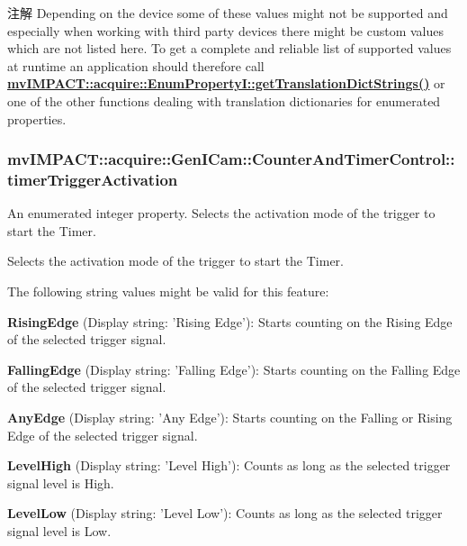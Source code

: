 \begin{DoxyNote}{注解}
Depending on the device some of these values might not be supported and especially when working with third party devices there might be custom values which are not listed here. To get a complete and reliable list of supported values at runtime an application should therefore call {\bfseries \hyperlink{classmv_i_m_p_a_c_t_1_1acquire_1_1_enum_property_i_a0ba6ccbf5ee69784d5d0b537924d26b6}{mv\+I\+M\+P\+A\+C\+T\+::acquire\+::\+Enum\+Property\+I\+::get\+Translation\+Dict\+Strings()}} or one of the other functions dealing with translation dictionaries for enumerated properties. 
\end{DoxyNote}
\hypertarget{classmv_i_m_p_a_c_t_1_1acquire_1_1_gen_i_cam_1_1_counter_and_timer_control_aafe9deefca2b00ca24218d2763082720}{
\subsubsection[{timer\+Trigger\+Activation}]{ mv\+I\+M\+P\+A\+C\+T\+::acquire\+::\+Gen\+I\+Cam\+::\+Counter\+And\+Timer\+Control\+::timer\+Trigger\+Activation}}\label{classmv_i_m_p_a_c_t_1_1acquire_1_1_gen_i_cam_1_1_counter_and_timer_control_aafe9deefca2b00ca24218d2763082720}


An enumerated integer property. Selects the activation mode of the trigger to start the Timer. 

Selects the activation mode of the trigger to start the Timer.

The following string values might be valid for this feature\+:
\begin{DoxyItemize}
\item {\bfseries Rising\+Edge} (Display string\+: 'Rising Edge')\+: Starts counting on the Rising Edge of the selected trigger signal.
\item {\bfseries Falling\+Edge} (Display string\+: 'Falling Edge')\+: Starts counting on the Falling Edge of the selected trigger signal.
\item {\bfseries Any\+Edge} (Display string\+: 'Any Edge')\+: Starts counting on the Falling or Rising Edge of the selected trigger signal.
\item {\bfseries Level\+High} (Display string\+: 'Level High')\+: Counts as long as the selected trigger signal level is High.
\item {\bfseries Level\+Low} (Display string\+: 'Level Low')\+: Counts as long as the selected trigger signal level is Low.
\end{DoxyItemize}

